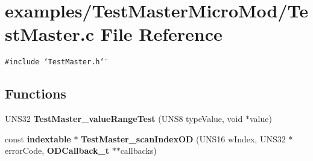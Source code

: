 \section{examples/Test\-Master\-Micro\-Mod/Test\-Master.c File Reference}
\label{TestMasterMicroMod_2TestMaster_8c}
{\tt \#include \char`\"{}Test\-Master.h\char`\"{}}\par
\subsection*{Functions}
\begin{CompactItemize}
\item 
UNS32 {\bf Test\-Master\_\-value\-Range\-Test} (UNS8 type\-Value, void $\ast$value)
\item 
const {\bf indextable} $\ast$ {\bf Test\-Master\_\-scan\-Index\-OD} (UNS16 w\-Index, UNS32 $\ast$error\-Code, {\bf ODCallback\_\-t} $\ast$$\ast$callbacks)
\end{CompactItemize}

